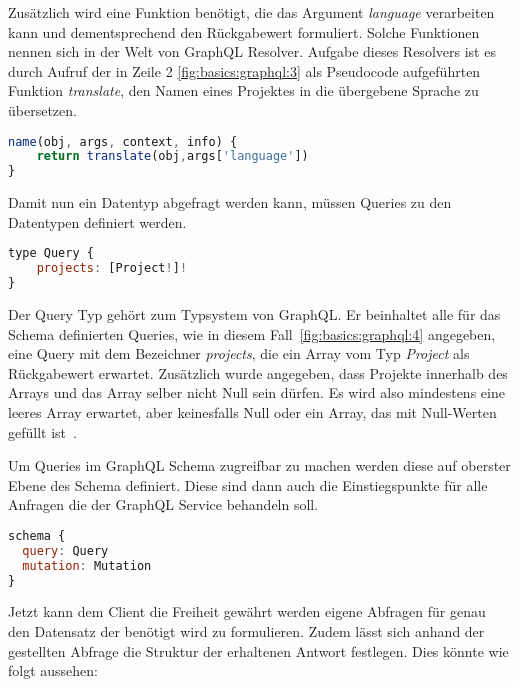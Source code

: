 Zusätzlich wird eine Funktion benötigt, die das Argument \emph{language} verarbeiten kann und dementsprechend den Rückgabewert formuliert.
Solche Funktionen nennen sich in der Welt von GraphQL Resolver.
Aufgabe dieses Resolvers ist es durch Aufruf der in Zeile 2 \ref{fig:basics:graphql:3} als Pseudocode aufgeführten Funktion \emph{translate},
den Namen eines Projektes in die übergebene Sprache zu übersetzen.

\begin{lstlisting}[language=Javascript,float=h!,caption={Resolver des Feldes \emph{name}}, label={fig:basics:graphql:3}]
name(obj, args, context, info) {
    return translate(obj,args['language'])
}
\end{lstlisting}

Damit nun ein Datentyp abgefragt werden kann, müssen Queries zu den Datentypen definiert werden.

\begin{lstlisting}[language=Javascript,float=h!,caption={GraphQL Query Typdefinition}, label={fig:basics:graphql:4}]
type Query {
    projects: [Project!]!
}
\end{lstlisting}

Der Query Typ gehört zum Typsystem von GraphQL. Er beinhaltet alle für das Schema definierten Queries, wie in diesem Fall~\ref{fig:basics:graphql:4} angegeben, eine Query mit dem Bezeichner \emph{projects}, die
ein Array vom Typ \emph{Project} als Rückgabewert erwartet. Zusätzlich wurde angegeben, dass Projekte innerhalb des Arrays und das Array selber nicht Null sein dürfen.
Es wird also mindestens eine leeres Array erwartet, aber keinesfalls Null oder ein Array, das mit Null-Werten gefüllt ist~\cite{graphql}.

Um Queries im GraphQL Schema zugreifbar zu machen werden diese auf oberster Ebene des Schema definiert. Diese sind dann auch die Einstiegspunkte für alle Anfragen die der GraphQL Service behandeln soll.

\begin{lstlisting}[language=Javascript,float=h!,caption={GraphQL Schema}, label={fig:basics:graphql:7}]
schema {
  query: Query
  mutation: Mutation
}
\end{lstlisting}

Jetzt kann dem Client die Freiheit gewährt werden eigene Abfragen für genau den Datensatz der benötigt wird zu formulieren.
Zudem lässt sich anhand der gestellten Abfrage die Struktur der erhaltenen Antwort festlegen. Dies könnte wie folgt aussehen:

